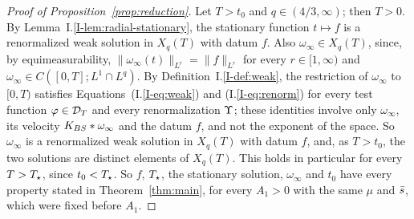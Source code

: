 \begin{proof}[Proof of Proposition~\ref{prop:reduction}]
Let $T>t_0$ and $q\in(4/3,\infty)$; then $T>0$. By
Lemma~I.\ref{I-lem:radial-stationary}, the stationary function $t\mapsto f$ is a
renormalized weak solution in $X_q(T)$ with datum $f$. Also $\omega_\infty\in
X_q(T)$, since, by equimeasurability, $\|\omega_\infty(t)\|_{L^r}=\|f\|_{L^r}$ for every
$r\in[1,\infty)$ and $\omega_\infty\in C([0,T];L^1\cap L^q)$. By
Definition~I.\ref{I-def:weak}, the restriction of $\omega_\infty$ to $[0,T)$
satisfies Equations~(I.\ref{I-eq:weak}) and (I.\ref{I-eq:renorm}) for every test function
$\varphi\in\mathcal{D}_T$ and every renormalization $\Upsilon$; these identities involve only
$\omega_\infty$, its velocity $K_{BS}\ast\omega_\infty$ and the datum $f$, and not
the exponent of the space. So $\omega_\infty$ is a renormalized weak solution in
$X_q(T)$ with datum $f$, and, as $T>t_0$, the two solutions are distinct elements
of $X_q(T)$. This holds in particular for every $T>T_\star$, since $t_0<T_\star$.
So $f$, $T_\star$, the stationary solution, $\omega_\infty$ and $t_0$ have every
property stated in Theorem~\ref{thm:main}, for every $A_1>0$ with the same $\mu$
and $\bar s$, which were fixed before $A_1$.
\end{proof}
